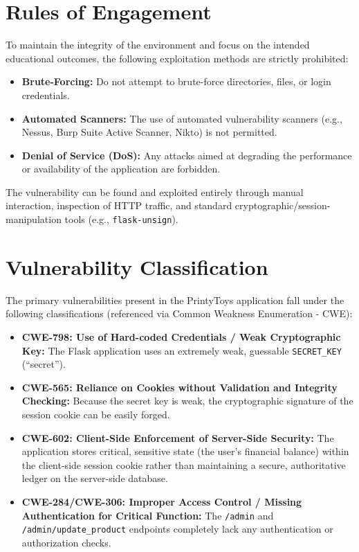 \documentclass[12pt,a4paper]{article}
\begin{document}
\section{Rules of Engagement}
To maintain the integrity of the environment and focus on the intended educational outcomes, the following exploitation methods are strictly prohibited:
\begin{itemize}
    \item \textbf{Brute-Forcing:} Do not attempt to brute-force directories, files, or login credentials.
    \item \textbf{Automated Scanners:} The use of automated vulnerability scanners (e.g., Nessus, Burp Suite Active Scanner, Nikto) is not permitted.
    \item \textbf{Denial of Service (DoS):} Any attacks aimed at degrading the performance or availability of the application are forbidden.
\end{itemize}
The vulnerability can be found and exploited entirely through manual interaction, inspection of HTTP traffic, and standard cryptographic/session-manipulation tools (e.g., \texttt{flask-unsign}).

\section{Vulnerability Classification}
The primary vulnerabilities present in the PrintyToys application fall under the following classifications (referenced via Common Weakness Enumeration - CWE):

\begin{itemize}
    \item \textbf{CWE-798: Use of Hard-coded Credentials / Weak Cryptographic Key:} The Flask application uses an extremely weak, guessable \texttt{SECRET\_KEY} (``secret'').
    \item \textbf{CWE-565: Reliance on Cookies without Validation and Integrity Checking:} Because the secret key is weak, the cryptographic signature of the session cookie can be easily forged.
    \item \textbf{CWE-602: Client-Side Enforcement of Server-Side Security:} The application stores critical, sensitive state (the user's financial balance) within the client-side session cookie rather than maintaining a secure, authoritative ledger on the server-side database.
    \item \textbf{CWE-284/CWE-306: Improper Access Control / Missing Authentication for Critical Function:} The \texttt{/admin} and \texttt{/admin/update\_product} endpoints completely lack any authentication or authorization checks.
\end{itemize}
\end{document}
